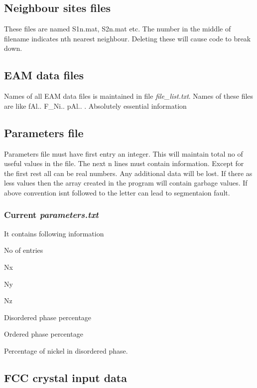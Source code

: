 \subsection*{Neighbour sites files}

These files are named S1n.\+mat, S2n.\+mat etc. The number in the middle of filename indicates n\textquotesingle{}th nearest neighbour. Deleting these will cause code to break down.

\subsection*{E\+AM data files}

Names of all E\+AM data files is maintained in file {\itshape file\+\_\+list.\+txt}. Names of these files are like f\+Al.. F\+\_\+\+Ni.. p\+Al.. . Absolutely essential information

\subsection*{Parameters file}

Parameters file must have first entry an integer. This will maintain total no of useful values in the file. The next n lines must contain information. Except for the first rest all can be real numbers. Any additional data will be lost. If there as less values then the array created in the program will contain garbage values. If above convention isn\textquotesingle{}t followed to the letter can lead to segmentaion fault.

\subsubsection*{Current {\itshape parameters.\+txt}}

It contains following information
\begin{DoxyEnumerate}
\item No of entries
\item Nx
\item Ny
\item Nz
\item Disordered phase percentage
\item Ordered phase percentage
\item Percentage of nickel in disordered phase.
\end{DoxyEnumerate}

\subsection*{F\+CC crystal input data}

